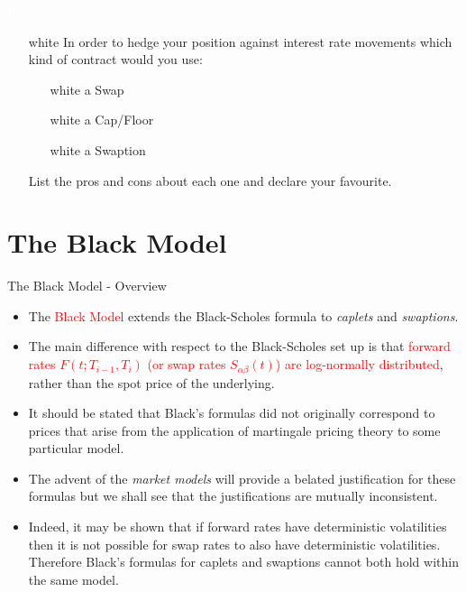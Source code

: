 \documentclass{beamer}
\begin{document}
\begin{homework}
\begin{frame}{\textcolor{white}{Homework}}
\begin{itemize}
\item[white] In order to hedge your position against interest rate movements which kind of contract would you use: 
\begin{itemize}
\item[white] a Swap
\item[white] a Cap/Floor
\item[white] a Swaption
\end{itemize}
List the pros and cons about each one and declare your favourite.
\end{itemize}
\end{frame}
\end{homework}























\section{The Black Model}
\begin{frame}{The Black Model - Overview}
	\begin{itemize}
		\item The \textcolor{red}{Black Model} extends the Black-Scholes formula to \emph{caplets} and \emph{swaptions}. %
		\item The main difference with respect to the Black-Scholes set up is that \textcolor{red}{forward rates $F(t;T_{i-1},T_i)$ (or swap rates $S_{\alpha\beta}(t)$) are log-normally distributed}, rather than the spot price of the underlying. 
		\item It should be stated that Black’s formulas did not originally correspond to prices that arise from the application of martingale pricing theory to some particular model. 
		\item The advent of the \emph{market models} will provide a belated justification for these formulas but we shall see that the justifications are mutually inconsistent. 
		\item Indeed, it may be shown that if forward rates have deterministic volatilities then it is not possible for swap rates to also have deterministic volatilities. Therefore Black’s formulas for caplets and swaptions cannot both hold within the same model. 
	\end{itemize}
\end{frame}
\end{document}
